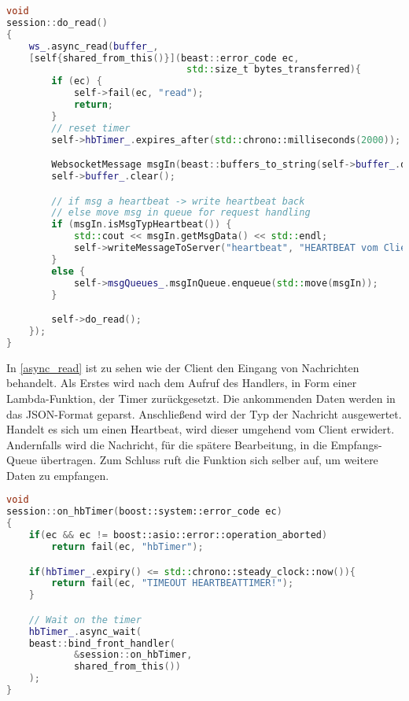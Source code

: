 \documentclass[thesis.tex]{subfiles}
\begin{document}
\begin{lstlisting}[caption={[Asynchrone Read-Funktion]Asynchrone Read-Funktion \lbrack eigene Darstellung\rbrack},captionpos=b,language=C++,label=async_read]
void
session::do_read()
{
    ws_.async_read(buffer_,
    [self{shared_from_this()}](beast::error_code ec,
                                std::size_t bytes_transferred){
        if (ec) {
            self->fail(ec, "read");
            return;
        }
        // reset timer
        self->hbTimer_.expires_after(std::chrono::milliseconds(2000));

        WebsocketMessage msgIn(beast::buffers_to_string(self->buffer_.data()));
        self->buffer_.clear();

        // if msg a heartbeat -> write heartbeat back
        // else move msg in queue for request handling
        if (msgIn.isMsgTypHeartbeat()) {
            std::cout << msgIn.getMsgData() << std::endl;
            self->writeMessageToServer("heartbeat", "HEARTBEAT vom Client");
        }
        else {
            self->msgQueues_.msgInQueue.enqueue(std::move(msgIn));
        }

        self->do_read();
    });
}
\end{lstlisting}

In \autoref{async_read} ist zu sehen wie der Client den Eingang von Nachrichten behandelt.
Als Erstes wird nach dem Aufruf des Handlers, in Form einer Lambda-Funktion, der Timer zurückgesetzt.
Die ankommenden Daten werden in das JSON-Format geparst.
Anschließend wird der Typ der Nachricht ausgewertet.
Handelt es sich um einen Heartbeat, wird dieser umgehend vom Client erwidert.
Andernfalls wird die Nachricht, für die spätere Bearbeitung, in die Empfangs-Queue übertragen.
Zum Schluss ruft die Funktion sich selber auf, um weitere Daten zu empfangen.

\begin{lstlisting}[caption={[Heartbeat Timer]Heartbeat Timer \lbrack eigene Darstellung\rbrack},captionpos=b,language=C++,label=hbtimer]
void
session::on_hbTimer(boost::system::error_code ec)
{
    if(ec && ec != boost::asio::error::operation_aborted)
        return fail(ec, "hbTimer");

    if(hbTimer_.expiry() <= std::chrono::steady_clock::now()){
        return fail(ec, "TIMEOUT HEARTBEATTIMER!");
    }

    // Wait on the timer
    hbTimer_.async_wait(
    beast::bind_front_handler(
            &session::on_hbTimer,
            shared_from_this())
    );
}
\end{lstlisting}
\end{document}
